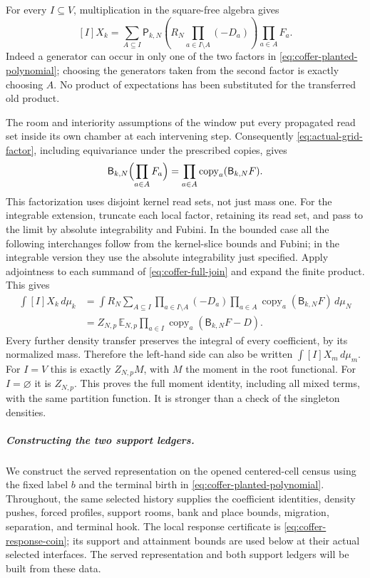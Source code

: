For every $I\subseteq V$, multiplication in the square-free algebra gives
\begin{equation}\label{eq:coffer-full-join}
 [I]X_k=\sum_{A\subseteq I}
  \mathsf P_{k,N}\left(R_N\prod_{a\in I\setminus A}(-D_a)\right)
                         \prod_{a\in A}F_a.
\end{equation}
Indeed a generator can occur in only one of the two factors in
\eqref{eq:coffer-planted-polynomial}; choosing the generators taken from
the second factor is exactly choosing $A$. No product of expectations
has been substituted for the transferred old product.

The room and interiority assumptions of the window put every propagated
read set inside its own chamber at each intervening step. Consequently
\eqref{eq:actual-grid-factor}, including equivariance under the prescribed
copies, gives
\[
 \mathsf B_{k,N}\Bigl(\prod_{a\in A}F_a\Bigr)
       =\prod_{a\in A}\operatorname{copy}_a
                              (\mathsf B_{k,N}F).
\]
This factorization uses disjoint kernel read sets, not just mass one.
For the integrable extension, truncate each local factor, retaining its
read set, and pass to the limit by absolute integrability and Fubini.
In the bounded case all the following interchanges follow from the
kernel-slice bounds and Fubini; in the integrable version they use the
absolute integrability just specified. Apply adjointness to each summand
of \eqref{eq:coffer-full-join} and expand the finite product. This gives
\begin{align}
 \int[I]X_k\,d\mu_k
 &=\int R_N\sum_{A\subseteq I}
       \prod_{a\in I\setminus A}(-D_a)
       \prod_{a\in A}\operatorname{copy}_a(\mathsf B_{k,N}F)
                                                    \,d\mu_N\nonumber\\
 &=Z_{N,p}\,\mathbb E_{N,p}
       \prod_{a\in I}\operatorname{copy}_a
                               (\mathsf B_{k,N}F-D).
 \label{eq:coffer-planted-moment}
\end{align}
Every further density transfer preserves the integral of every
coefficient, by its normalized mass. Therefore the left-hand side can
also be written $\int[I]X_m\,d\mu_m$. For $I=V$ this is exactly
$Z_{N,p}M$, with $M$ the moment in the root functional. For $I=\varnothing$
it is $Z_{N,p}$. This proves the full moment identity, including all
mixed terms, with the same partition function. It is stronger than a
check of the singleton densities.

\subparagraph{Constructing the two support ledgers.}
We construct the served representation on the opened centered-cell
census using the fixed label $b$ and the terminal birth in
\eqref{eq:coffer-planted-polynomial}. Throughout, the same selected
history supplies the coefficient identities, density pushes, forced
profiles, support rooms, bank and place bounds, migration, separation,
and terminal hook. The local response certificate is
\eqref{eq:coffer-response-coin}; its support and attainment bounds
are used below at their actual selected interfaces. The served representation
and both support ledgers will be built from these data.

